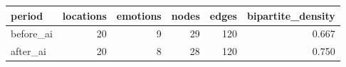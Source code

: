 \begin{tabular}{lrrrrr}
\toprule
period & locations & emotions & nodes & edges & bipartite\_density \\
\midrule
before\_ai & 20 & 9 & 29 & 120 & 0.667 \\
after\_ai & 20 & 8 & 28 & 120 & 0.750 \\
\bottomrule
\end{tabular}
